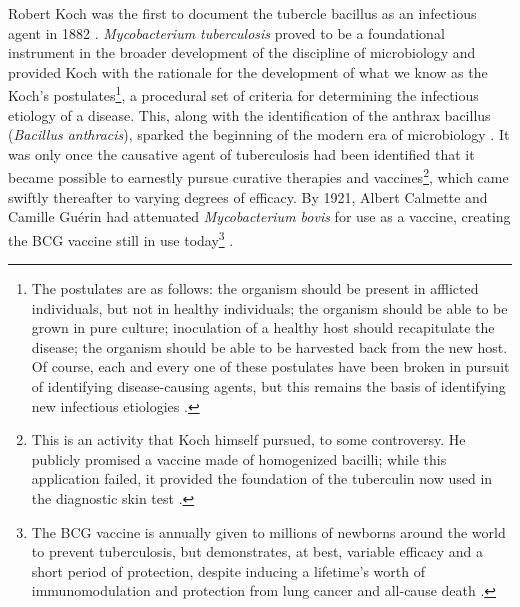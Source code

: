 Robert Koch was the first to document the tubercle bacillus as an infectious agent in 1882 \citep{Koch1882, Cambau2014}. \textit{Mycobacterium tuberculosis} proved to be a foundational instrument in the broader development of the discipline of microbiology and provided Koch with the rationale for the development of what we know as the Koch's postulates\footnote{The postulates are as follows: the organism should be present in afflicted individuals, but not in healthy individuals; the organism should be able to be grown in pure culture; inoculation of a healthy host should recapitulate the disease; the organism should be able to be harvested back from the new host. Of course, each and every one of these postulates have been broken in pursuit of identifying disease\hyp{}causing agents, but this remains the basis of identifying new infectious etiologies \citep{Segre2013}.}, a procedural set of criteria for determining the infectious etiology of a disease. This, along with the identification of the anthrax bacillus (\textit{Bacillus anthracis}), sparked the beginning of the modern era of microbiology \citep{Koch1876}. It was only once the causative agent of tuberculosis had been identified that it became possible to earnestly pursue curative therapies and vaccines\footnote{This is an activity that Koch himself pursued, to some controversy. He publicly promised a vaccine made of homogenized bacilli; while this application failed, it provided the foundation of the tuberculin now used in the diagnostic skin test \citep{Goetz2014}.}, which came swiftly thereafter to varying degrees of efficacy. By 1921, Albert Calmette and Camille Gu\'{e}rin had attenuated \textit{Mycobacterium bovis} for use as a vaccine, creating the BCG vaccine still in use today\footnote{The BCG vaccine is annually given to millions of newborns around the world to prevent tuberculosis, but demonstrates, at best, variable efficacy \citep{Schrager2020, Andersen2005} and a short period of protection, despite inducing a lifetime's worth of immunomodulation and protection from lung cancer and all\hyp{}cause death \citep{Higgins2016}.} \citep{Hawgood2007}. 


